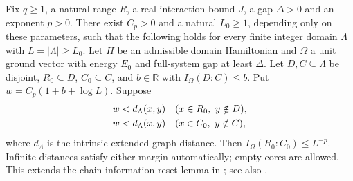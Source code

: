 \begin{lemma}
    \label{thm:domain_information_reset}
    \leanok
    Fix $q\ge1$, a natural range $R$, a real interaction bound $J$, a gap
    $\Delta>0$ and an exponent $p>0$. There exist $C_p>0$ and a natural
    $L_0\ge1$, depending only on these parameters, such that the following
    holds for every finite integer domain $\Lambda$ with $L=|\Lambda|\ge L_0$.
    Let $H$ be an admissible domain Hamiltonian and $\Omega$ a unit ground
    vector with energy $E_0$ and full-system gap at least $\Delta$.
    Let $D,C\subseteq\Lambda$ be disjoint, $R_0\subseteq D$, $C_0\subseteq C$,
    and $b\in\mathbb R$ with $I_\Omega(D:C)\le b$. Put
    $w=C_p(1+b+\log L)$. Suppose
    \begin{align}
        w & <d_\Lambda(x,y) &  & (x\in R_0,\ y\notin D),\notag \\
        w & <d_\Lambda(x,y) &  & (x\in C_0,\ y\notin C),\notag
    \end{align}
    where $d_\Lambda$ is the intrinsic extended graph distance. Then
    $I_\Omega(R_0:C_0)\le L^{-p}$.
    Infinite distances satisfy either margin automatically; empty cores are
    allowed. This extends the chain information-reset
    lemma in \cite[Part~IIa]{TNLean2026OneDimensional}; see also
    \cite{gap:tnlean_one_dimensional_connected_domain_scope}.
\end{lemma}
